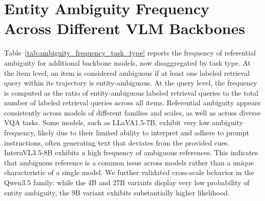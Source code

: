 \documentclass{article} %
\begin{document}
\section{Entity Ambiguity Frequency Across Different VLM Backbones}\label{app:ambiguity_frequency}
Table~\ref{tab:ambiguity_frequency_task_type} reports the frequency of referential ambiguity for additional backbone models, now disaggregated by task type. At the item level, an item is considered ambiguous if at least one labeled retrieval query within its trajectory is entity-ambiguous. At the query level, the frequency is computed as the ratio of entity-ambiguous labeled retrieval queries to the total number of labeled retrieval queries across all items. Referential ambiguity appears consistently across models of different families and scales, as well as across diverse VQA tasks. Some models, such as LLaVA1.5-7B, exhibit very low ambiguity frequency, likely due to their limited ability to interpret and adhere to prompt instructions, often generating text that deviates from the provided cues. InternVL3.5-8B exhibits a high frequency of ambiguous references. This indicates that ambiguous reference is a common issue across models rather than a unique characteristic of a single model. We further validated cross-scale behavior in the Qwen3.5 family: while the 4B and 27B variants display very low probability of entity ambiguity, the 9B variant exhibits substantially higher likelihood.
\end{document}
